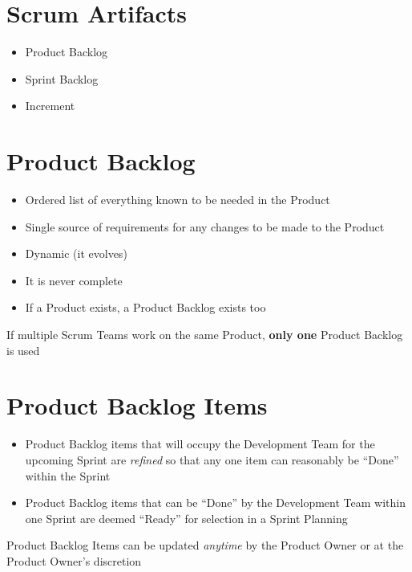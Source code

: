 \documentclass[a4paper,11pt,twocolumn]{article}
\begin{document}
\section*{Scrum Artifacts}
\begin{itemize}
	\item Product Backlog
	\item Sprint Backlog
	\item Increment
\end{itemize}

\section*{Product Backlog}
\begin{itemize}
	\item Ordered list of everything known to be needed in the Product
	\item Single source of requirements for any changes to be made to the Product
	\item Dynamic (it evolves)
	\item It is never complete
	\item If a Product exists, a Product Backlog exists too
\end{itemize}

\begin{tcolorbox}[colback=black!8!white,colframe=gray!50!black,title=Note,sharp corners,fonttitle=\normalsize\bfseries,fontupper=\normalsize,left=0.7em,right=0.7em]
	If multiple Scrum Teams work on the same Product, \textbf{only one} Product Backlog is used
\end{tcolorbox}

\section*{Product Backlog Items}
\begin{itemize}
	\item Product Backlog items that will occupy the Development Team for the upcoming Sprint are \textit{refined} so that any one item can reasonably be ``Done'' within the Sprint
	\item Product Backlog items that can be ``Done'' by the Development Team within one Sprint are deemed ``Ready'' for selection in a Sprint Planning
\end{itemize}

\begin{tcolorbox}[colback=black!8!white,colframe=gray!50!black,title=Note,sharp corners,fonttitle=\normalsize\bfseries,fontupper=\normalsize,left=0.7em,right=0.7em]
	Product Backlog Items can be updated \textit{anytime} by the Product Owner or at the Product Owner's discretion
\end{tcolorbox}
\end{document}
